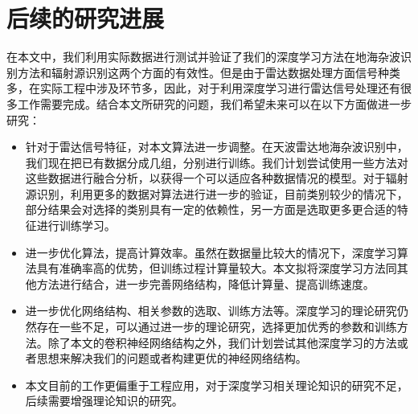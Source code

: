\section{后续的研究进展}
在本文中，我们利用实际数据进行测试并验证了我们的深度学习方法在地海杂波识别方法和辐射源识别这两个方面的有效性。但是由于雷达数据处理方面信号种类多，在实际工程中涉及环节多，因此，对于利用深度学习进行雷达信号处理还有很多工作需要完成。结合本文所研究的问题，我们希望未来可以在以下方面做进一步研究：
\begin{itemize}
	\item 针对于雷达信号特征，对本文算法进一步调整。在天波雷达地海杂波识别中，我们现在把已有数据分成几组，分别进行训练。我们计划尝试使用一些方法对这些数据进行融合分析，以获得一个可以适应各种数据情况的模型。对于辐射源识别，利用更多的数据对算法进行进一步的验证，目前类别较少的情况下，部分结果会对选择的类别具有一定的依赖性，另一方面是选取更多更合适的特征进行训练学习。
	\item 进一步优化算法，提高计算效率。虽然在数据量比较大的情况下，深度学习算法具有准确率高的优势，但训练过程计算量较大。本文拟将深度学习方法同其他方法进行结合，进一步完善网络结构，降低计算量、提高训练速度。
	\item 进一步优化网络结构、相关参数的选取、训练方法等。深度学习的理论研究仍然存在一些不足，可以通过进一步的理论研究，选择更加优秀的参数和训练方法。除了本文的卷积神经网络结构之外，我们计划尝试其他深度学习的方法或者思想来解决我们的问题或者构建更优的神经网络结构。
	\item 本文目前的工作更偏重于工程应用，对于深度学习相关理论知识的研究不足，后续需要增强理论知识的研究。
\end{itemize}

